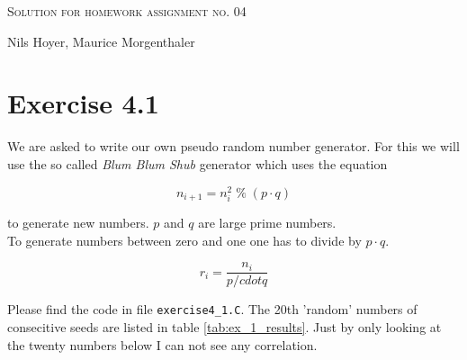 \documentclass[10pt]{article}
\newenvironment{myfont}{\fontfamily{put}\selectfont}{\par}
\begin{document}
\begin{myfont}

\begin{center}
  \begin{Large}
    \textsc{Solution for homework assignment no. 04} \\
  \end{Large}
	\vspace*{0.4cm}
    Nils Hoyer, Maurice Morgenthaler
  \vspace*{1cm}
\end{center}

\section*{Exercise 4.1}

We are asked to write our own pseudo random number generator.
For this we will use the so called \textit{Blum Blum Shub} generator which uses the equation

\begin{equation}
n_{i+1} = n_{i}^{2} \;\%\; (p \cdot q)
\end{equation}

\noindent to generate new numbers.
$p$ and $q$ are large prime numbers. \\
To generate numbers between zero and one one has to divide by $p \cdot q$.

\begin{equation}
r_{i} = \frac{n_{i}}{p /cdot q}
\end{equation}

\noindent Please find the code in file \texttt{exercise4\_1.C}.
The 20th 'random' numbers of consecitive seeds are listed in table \ref{tab:ex_1_results}.
Just by only looking at the twenty numbers below I can not see any correlation.


\end{myfont}
\end{document}
